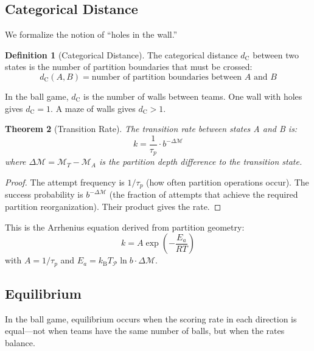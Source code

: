 \documentclass[twocolumn,10pt,a4paper]{article}
\newtheorem{theorem}{Theorem}[section]
\theoremstyle{definition}
\newtheorem{definition}[theorem]{Definition}
\theoremstyle{remark}
\newcommand{\kB}{k_{\mathrm{B}}}
\newcommand{\Depth}{\mathcal{M}}
\newcommand{\Part}{\mathcal{P}}
\newcommand{\dC}{d_{\mathrm{C}}}
\begin{document}
\subsection{Categorical Distance}

We formalize the notion of ``holes in the wall.''

\begin{definition}[Categorical Distance]
\label{def:distance}
The categorical distance $\dC$ between two states is the number of partition boundaries that must be crossed:
\begin{equation}
    \dC(A, B) = \text{number of partition boundaries between } A \text{ and } B
\end{equation}
\end{definition}

In the ball game, $\dC$ is the number of walls between teams. One wall with holes gives $\dC = 1$. A maze of walls gives $\dC > 1$.

\begin{theorem}[Transition Rate]
\label{thm:rate}
The transition rate between states A and B is:
\begin{equation}
    k = \frac{1}{\tau_p} \cdot b^{-\Delta\Depth}
\end{equation}
where $\Delta\Depth = \Depth_T - \Depth_A$ is the partition depth difference to the transition state.
\end{theorem}

\begin{proof}
The attempt frequency is $1/\tau_p$ (how often partition operations occur). The success probability is $b^{-\Delta\Depth}$ (the fraction of attempts that achieve the required partition reorganization). Their product gives the rate.
\end{proof}

This is the Arrhenius equation derived from partition geometry:
\begin{equation}
    k = A \exp\left(-\frac{E_a}{RT}\right)
\end{equation}
with $A = 1/\tau_p$ and $E_a = \kB T_{\Part} \ln b \cdot \Delta\Depth$.

\subsection{Equilibrium}

In the ball game, equilibrium occurs when the scoring rate in each direction is equal---not when teams have the same number of balls, but when the rates balance.
\end{document}
